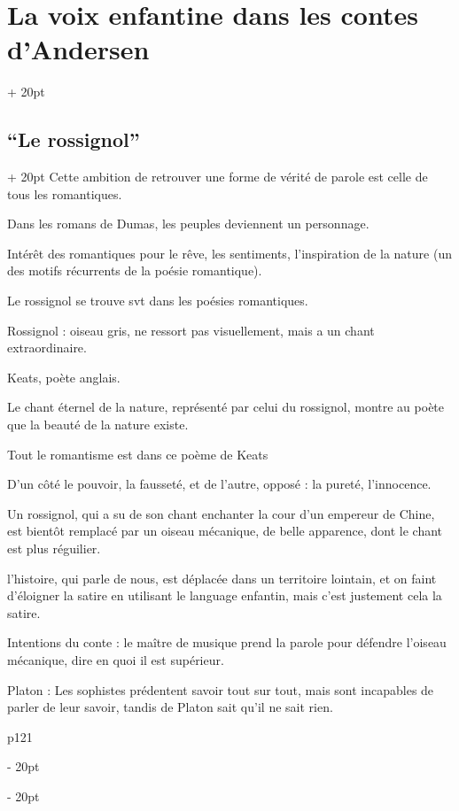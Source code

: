 \documentclass[a4paper, 12pt, twoside]{article}
\newcommand{\ind}[1][20pt]{\advance\leftskip + #1}
\newcommand{\deind}[1][20pt]{\advance\leftskip - #1}
\newenvironment{indt}[2][20pt]{#2 \par \ind[#1]}{\par \deind} %
\begin{document}
\begin{indt}{\section{La voix enfantine dans les contes d'Andersen}}
        \vspace{12pt}
        
        \begin{indt}{\subsection{``Le rossignol''}}
            Cette ambition de retrouver une forme de vérité de parole est celle de tous les romantiques.
            
            Dans les romans de Dumas, les peuples deviennent un personnage.
            
            Intérêt des romantiques pour le rêve, les sentiments, l'inspiration de la nature (un des motifs récurrents de la poésie romantique).
            
            Le rossignol se trouve svt dans les poésies romantiques.
            
            Rossignol : oiseau gris, ne ressort pas visuellement, mais a un chant extraordinaire.
            
            Keats, poète anglais.
            
            Le chant éternel de la nature, représenté par celui du rossignol, montre au poète que la beauté de la nature existe.
            
            Tout le romantisme est dans ce poème de Keats
            
            D'un côté le pouvoir, la fausseté, et de l'autre, opposé : la pureté, l'innocence.
            
            Un rossignol, qui a su de son chant enchanter la cour d'un empereur de Chine, est bientôt remplacé par un oiseau mécanique, de belle apparence, dont le chant est plus réguilier.
            
            l'histoire, qui parle de nous, est déplacée dans un territoire lointain, et on faint d'éloigner la satire en utilisant le language enfantin, mais c'est justement cela la satire.
            
            Intentions du conte : le maître de musique prend la parole pour défendre l'oiseau mécanique, dire en quoi il est supérieur.
            
            Platon : Les sophistes prédentent savoir tout sur tout, mais sont incapables de parler de leur savoir, tandis de Platon sait qu'il ne sait rien.
            
            p121
            

\end{indt}
\end{indt}
\end{document}
